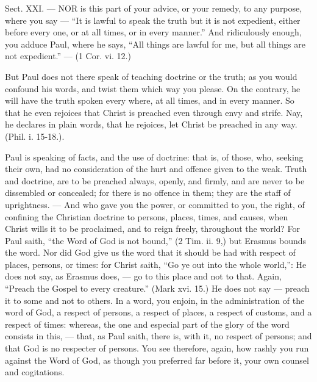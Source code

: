 
Sect. XXI. — NOR is this part of your advice, or your remedy, to any purpose, where you say — “It is lawful to speak the truth but it is not expedient, either before every one, or at all times, or in every manner.” And ridiculously enough, you adduce Paul, where he says, “All things are lawful for me, but all things are not expedient.” — (1 Cor. vi. 12.)

But Paul does not there speak of teaching doctrine or the truth; as you would confound his words, and twist them which way you please. On the contrary, he will have the truth spoken every where, at all times, and in every manner. So that he even rejoices that Christ is preached even through envy and strife. Nay, he declares in plain words, that he rejoices, let Christ be preached in any way. (Phil. i. 15-18.).

Paul is speaking of facts, and the use of doctrine: that is, of those, who, seeking their own, had no consideration of the hurt and offence given to the weak. Truth and doctrine, are to be preached always, openly, and firmly, and are never to be dissembled or concealed; for there is no offence in them; they are the staff of uprightness. — And who gave you the power, or committed to you, the right, of confining the Christian doctrine to persons, places, times, and causes, when Christ wills it to be proclaimed, and to reign freely, throughout the world? For Paul saith, “the Word of God is not bound,” (2 Tim. ii. 9,) but Erasmus bounds the word. Nor did God give us the word that it should be had with respect of places, persons, or times: for Christ saith, “Go ye out into the whole world,”: He does not say, as Erasmus does, — go to this place and not to that. Again, “Preach the Gospel to every creature.” (Mark xvi. 15.) He does not say — preach it to some and not to others. In a word, you enjoin, in the administration of the word of God, a respect of persons, a respect of places, a respect of customs, and a respect of times: whereas, the one and especial part of the glory of the word consists in this, — that, as Paul saith, there is, with it, no respect of persons; and that God is no respecter of persons. You see therefore, again, how rashly you run against the Word of God, as though you preferred far before it, your own counsel and cogitations.

